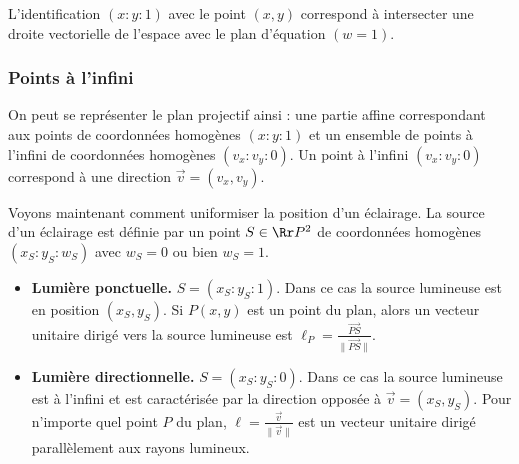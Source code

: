 \documentclass[11pt,class=report,crop=false]{standalone}
\begin{document}
L'identification $(x:y:1)$ avec le point $(x,y)$ correspond à intersecter une droite vectorielle de l'espace avec le plan d'équation $(w=1)$.


\subsubsection{Points à l'infini}

On peut se représenter le plan projectif ainsi : une partie affine correspondant 
aux points de coordonnées homogènes $(x:y:1)$ et un ensemble de points à l'infini de coordonnées homogènes $(v_x:v_y:0)$. Un point à l'infini $(v_x:v_y:0)$ correspond à une direction $\vec v =  (v_x,v_y)$.


Voyons maintenant comment uniformiser la position d'un éclairage.
La source d'un éclairage est définie par un point $S \in \Rr P^2$ de coordonnées homogènes $(x_S:y_S:w_S)$ avec $w_S=0$ ou bien $w_S=1$.

\begin{itemize}
	\item \textbf{Lumière ponctuelle.} $S = (x_S:y_S:1)$. Dans ce cas la source lumineuse est en position $(x_S,y_S)$. Si $P(x,y)$ est un point du plan, alors un vecteur unitaire dirigé vers la source lumineuse est $\ell_P = \frac{\vec{PS}}{\|\vec{PS}\|}$.
	
	\item \textbf{Lumière directionnelle.} $S = (x_S:y_S:0)$. Dans ce cas la source lumineuse est \og{}à l'infini\fg{} et est caractérisée par la direction opposée à $\vec v =  (x_S,y_S)$. Pour n'importe quel point $P$ du plan, $\ell = \frac{\vec v}{\|\vec v\|}$ est un vecteur unitaire dirigé parallèlement aux rayons lumineux.
\end{itemize}

\begin{center}
\begin{minipage}{0.45\textwidth}
\end{minipage} \quad	
\begin{minipage}{0.45\textwidth}
\end{minipage}
\end{center}



\end{document}

